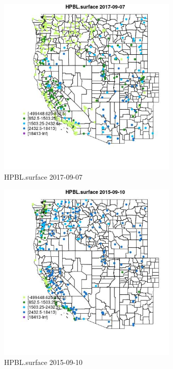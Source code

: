 \begin{figure} 
\centering  
\includegraphics[width=0.77\textwidth]{Code_Outputs/Report_ML_input_PM25_Step4_part_e_de_duplicated_aves_compiled_2019-05-20wNAs_MapObsHPBLsurface2017-09-07.jpg} 
\caption{\label{fig:Report_ML_input_PM25_Step4_part_e_de_duplicated_aves_compiled_2019-05-20wNAsMapObsHPBLsurface2017-09-07}HPBL.surface 2017-09-07} 
\end{figure} 
 

\begin{figure} 
\centering  
\includegraphics[width=0.77\textwidth]{Code_Outputs/Report_ML_input_PM25_Step4_part_e_de_duplicated_aves_compiled_2019-05-20wNAs_MapObsHPBLsurface2015-09-10.jpg} 
\caption{\label{fig:Report_ML_input_PM25_Step4_part_e_de_duplicated_aves_compiled_2019-05-20wNAsMapObsHPBLsurface2015-09-10}HPBL.surface 2015-09-10} 
\end{figure} 
 

